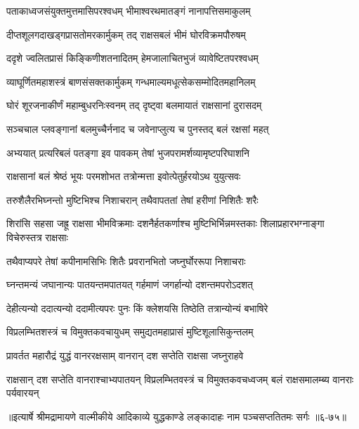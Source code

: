 \twolineshloka
{पताकाध्वजसंयुक्तमुत्तमासिपरश्वधम्}
{भीमाश्वरथमातङ्गं नानापत्तिसमाकुलम्} %

\twolineshloka
{दीप्तशूलगदाखड्गप्रासतोमरकार्मुकम्}
{तद् राक्षसबलं भीमं घोरविक्रमपौरुषम्} %

\twolineshloka
{ददृशे ज्वलितप्रासं किङ्किणीशतनादितम्}
{हेमजालाचितभुजं व्यावेष्टितपरश्वधम्} %

\twolineshloka
{व्याघूर्णितमहाशस्त्रं बाणसंसक्तकार्मुकम्}
{गन्धमाल्यमधूत्सेकसम्मोदितमहानिलम्} %

\twolineshloka
{घोरं शूरजनाकीर्णं महाम्बुधरनिःस्वनम्}
{तद् दृष्ट्वा बलमायातं राक्षसानां दुरासदम्} %

\twolineshloka
{सञ्चचाल प्लवङ्गानां बलमुच्चैर्ननाद च}
{जवेनाप्लुत्य च पुनस्तद् बलं रक्षसां महत्} %

\twolineshloka
{अभ्ययात् प्रत्यरिबलं पतङ्गा इव पावकम्}
{तेषां भुजपरामर्शव्यामृष्टपरिघाशनि} %

\twolineshloka
{राक्षसानां बलं श्रेष्ठं भूयः परमशोभत}
{तत्रोन्मत्ता इवोत्पेतुर्हरयोऽथ युयुत्सवः} %

\twolineshloka
{तरुशैलैरभिघ्नन्तो मुष्टिभिश्च निशाचरान्}
{तथैवापततां तेषां हरीणां निशितैः शरैः} %

\threelineshloka
{शिरांसि सहसा जह्रू राक्षसा भीमविक्रमाः}
{दशनैर्हतकर्णाश्च मुष्टिभिर्भिन्नमस्तकाः}
{शिलाप्रहारभग्नाङ्गा विचेरुस्तत्र राक्षसाः} %

\twolineshloka
{तथैवाप्यपरे तेषां कपीनामसिभिः शितैः}
{प्रवरानभितो जघ्नुर्घोररूपा निशाचराः} %

\twolineshloka
{घ्नन्तमन्यं जघानान्यः पातयन्तमपातयत्}
{गर्हमाणं जगर्हान्यो दशन्तमपरोऽदशत्} %

\twolineshloka
{देहीत्यन्यो ददात्यन्यो ददामीत्यपरः पुनः}
{किं क्लेशयसि तिष्ठेति तत्रान्योन्यं बभाषिरे} %

\twolineshloka
{विप्रलम्भितशस्त्रं च विमुक्तकवचायुधम्}
{समुद्यतमहाप्रासं मुष्टिशूलासिकुन्तलम्} %

\twolineshloka
{प्रावर्तत महारौद्रं युद्धं वानररक्षसाम्}
{वानरान् दश सप्तेति राक्षसा जघ्नुराहवे} %

\threelineshloka
{राक्षसान् दश सप्तेति वानराश्चाभ्यपातयन्}
{विप्रलम्भितवस्त्रं च विमुक्तकवचध्वजम्}
{बलं राक्षसमालम्ब्य वानराः पर्यवारयन्} %


॥इत्यार्षे श्रीमद्रामायणे वाल्मीकीये आदिकाव्ये युद्धकाण्डे लङ्कादाहः नाम पञ्चसप्ततितमः सर्गः ॥६-७५॥
